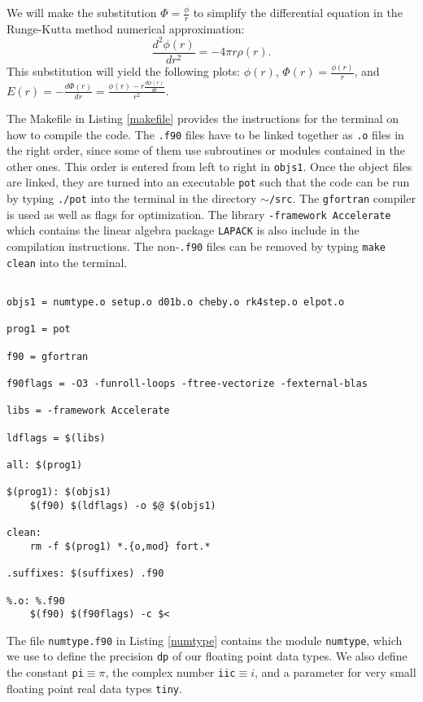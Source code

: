 \documentclass[12pt]{article}
\begin{document}
We will make the substitution $\Phi=\frac{\phi}{r}$ to simplify the differential equation in the Runge-Kutta method numerical approximation: \[\frac{d^2\phi(r)}{dr^2}=-4\pi r\rho(r).\]  This substitution will yield the following plots: $\phi(r)$, $\Phi(r)=\frac{\phi(r)}{r}$, and $E(r)=-\frac{d\Phi(r)}{dr}=\frac{\phi(r)-r\frac{d\phi(r)}{dr}}{r^2}$.

The Makefile in Listing \ref{makefile} provides the instructions for the terminal on how to compile the code.  The {\tt *.f90} files have to be linked together as {\tt *.o} files in the right order, since some of them use subroutines or modules contained in the other ones.  This order is entered from left to right in {\tt objs1}.  Once the object files are linked, they are turned into an executable {\tt pot} such that the code can be run by typing {\tt ./pot} into the terminal in the directory {\tt $\sim$/src}.  The {\tt gfortran} compiler is used as well as flags for optimization. The library {\tt -framework Accelerate} which contains the linear algebra package {\tt LAPACK} is also include in the compilation instructions.  The non-{\tt *.f90} files can be removed by typing {\tt make clean} into the terminal.

\begin{lstlisting}[frame=single,caption={{\tt Makefile}},label=makefile]

objs1 = numtype.o setup.o d01b.o cheby.o rk4step.o elpot.o 

prog1 = pot

f90 = gfortran

f90flags = -O3 -funroll-loops -ftree-vectorize -fexternal-blas

libs = -framework Accelerate

ldflags = $(libs)

all: $(prog1)

$(prog1): $(objs1)
	$(f90) $(ldflags) -o $@ $(objs1)

clean: 
	rm -f $(prog1) *.{o,mod} fort.*

.suffixes: $(suffixes) .f90

%.o: %.f90
	$(f90) $(f90flags) -c $<

\end{lstlisting}

The file {\tt numtype.f90} in Listing \ref{numtype} contains the module {\tt numtype}, which we use to define the precision {\tt dp} of our floating point data types.  We also define the constant {\tt pi}$\equiv\pi$, the complex number {\tt iic}$\equiv i$, and a parameter for very small floating point real data types {\tt tiny}.
\end{document}

